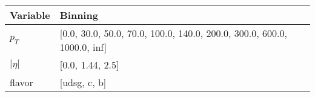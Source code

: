 \begin{tabular}{p{1.5cm}|p{6cm}}
Variable & Binning  \\
\hline
$p_T$    & [0.0, 30.0, 50.0, 70.0, 100.0, 140.0, 200.0, 300.0, 600.0, 1000.0, inf]\\
$|\eta|$ & [0.0, 1.44, 2.5] \\
flavor   & [udsg, c, b]
\end{tabular} 
